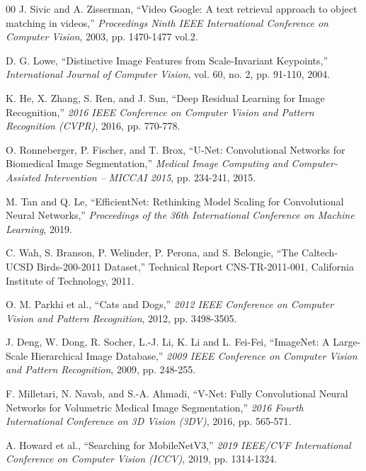 \documentclass[conference]{IEEEtran}
\begin{document}
\begin{thebibliography}{00}
 J. Sivic and A. Zisserman, ``Video Google: A text retrieval approach to object matching in videos,'' \textit{Proceedings Ninth IEEE International Conference on Computer Vision}, 2003, pp. 1470-1477 vol.2.

 D. G. Lowe, ``Distinctive Image Features from Scale-Invariant Keypoints,'' \textit{International Journal of Computer Vision}, vol. 60, no. 2, pp. 91-110, 2004.

 K. He, X. Zhang, S. Ren, and J. Sun, ``Deep Residual Learning for Image Recognition,'' \textit{2016 IEEE Conference on Computer Vision and Pattern Recognition (CVPR)}, 2016, pp. 770-778.

 O. Ronneberger, P. Fischer, and T. Brox, ``U-Net: Convolutional Networks for Biomedical Image Segmentation,'' \textit{Medical Image Computing and Computer-Assisted Intervention – MICCAI 2015}, pp. 234-241, 2015.

 M. Tan and Q. Le, ``EfficientNet: Rethinking Model Scaling for Convolutional Neural Networks,'' \textit{Proceedings of the 36th International Conference on Machine Learning}, 2019.

 C. Wah, S. Branson, P. Welinder, P. Perona, and S. Belongie, ``The Caltech-UCSD Birds-200-2011 Dataset,'' Technical Report CNS-TR-2011-001, California Institute of Technology, 2011.

 O. M. Parkhi et al., ``Cats and Dogs,'' \textit{2012 IEEE Conference on Computer Vision and Pattern Recognition}, 2012, pp. 3498-3505.

 J. Deng, W. Dong, R. Socher, L.-J. Li, K. Li and L. Fei-Fei, ``ImageNet: A Large-Scale Hierarchical Image Database,'' \textit{2009 IEEE Conference on Computer Vision and Pattern Recognition}, 2009, pp. 248-255.

 F. Milletari, N. Navab, and S.-A. Ahmadi, ``V-Net: Fully Convolutional Neural Networks for Volumetric Medical Image Segmentation,'' \textit{2016 Fourth International Conference on 3D Vision (3DV)}, 2016, pp. 565-571.

 A. Howard et al., ``Searching for MobileNetV3,'' \textit{2019 IEEE/CVF International Conference on Computer Vision (ICCV)}, 2019, pp. 1314-1324.
\end{thebibliography}
\end{document}
